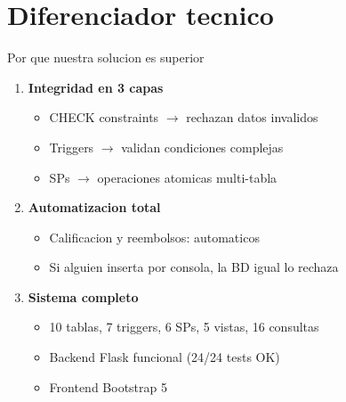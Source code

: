 ﻿\documentclass[11pt,aspectratio=169]{beamer}
\begin{document}
\section{Diferenciador tecnico}

\begin{frame}{Por que nuestra solucion es superior}
    \begin{enumerate}
        \item \textbf{Integridad en 3 capas}
        \begin{itemize}
            \item CHECK constraints $\rightarrow$ rechazan datos invalidos
            \item Triggers $\rightarrow$ validan condiciones complejas
            \item SPs $\rightarrow$ operaciones atomicas multi-tabla
        \end{itemize}
        \vspace{0.2cm}
        \item \textbf{Automatizacion total}
        \begin{itemize}
            \item Calificacion y reembolsos: automaticos
            \item Si alguien inserta por consola, la BD igual lo rechaza
        \end{itemize}
        \vspace{0.2cm}
        \item \textbf{Sistema completo}
        \begin{itemize}
            \item 10 tablas, 7 triggers, 6 SPs, 5 vistas, 16 consultas
            \item Backend Flask funcional (24/24 tests OK)
            \item Frontend Bootstrap 5
        \end{itemize}
    \end{enumerate}
\end{frame}
\end{document}

